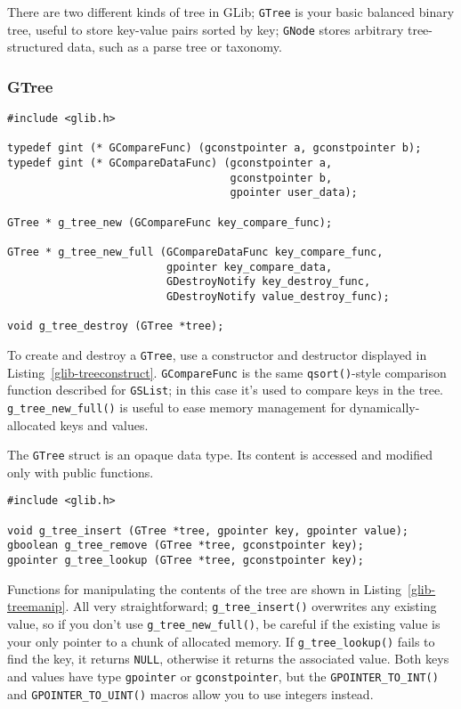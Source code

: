 There are two different kinds of tree in GLib; \lstinline{GTree} is your basic balanced binary tree, useful to store key-value pairs sorted by key; \lstinline{GNode} stores arbitrary tree-structured data, such as a parse tree or taxonomy.

\subsubsection{GTree}

\begin{lstlisting}[float, caption={Creating and destroying balanced binary trees}, label=glib-treeconstruct]
#include <glib.h>

typedef gint (* GCompareFunc) (gconstpointer a, gconstpointer b);
typedef gint (* GCompareDataFunc) (gconstpointer a,
                                   gconstpointer b,
                                   gpointer user_data);

GTree * g_tree_new (GCompareFunc key_compare_func);

GTree * g_tree_new_full (GCompareDataFunc key_compare_func,
                         gpointer key_compare_data,
                         GDestroyNotify key_destroy_func,
                         GDestroyNotify value_destroy_func);

void g_tree_destroy (GTree *tree);
\end{lstlisting}

To create and destroy a \lstinline{GTree}, use a constructor and destructor displayed in Listing~\ref{glib-treeconstruct}. \lstinline{GCompareFunc} is the same \lstinline{qsort()}-style comparison function described for \lstinline{GSList}; in this case it's used to compare keys in the tree. \lstinline{g_tree_new_full()} is useful to ease memory management for dynamically-allocated keys and values.

The \lstinline{GTree} struct is an opaque data type. Its content is accessed and modified only with public functions.

\begin{lstlisting}[float, caption={Manipulating \lstinline{GTree} contents}, label=glib-treemanip]
#include <glib.h>

void g_tree_insert (GTree *tree, gpointer key, gpointer value);
gboolean g_tree_remove (GTree *tree, gconstpointer key);
gpointer g_tree_lookup (GTree *tree, gconstpointer key);
\end{lstlisting}

Functions for manipulating the contents of the tree are shown in Listing~\ref{glib-treemanip}. All very straightforward; \lstinline{g_tree_insert()} overwrites any existing value, so if you don't use \lstinline{g_tree_new_full()}, be careful if the existing value is your only pointer to a chunk of allocated memory. If \lstinline{g_tree_lookup()} fails to find the key, it returns \lstinline{NULL}, otherwise it returns the associated value. Both keys and values have type \lstinline{gpointer} or \lstinline{gconstpointer}, but the \lstinline{GPOINTER_TO_INT()} and \lstinline{GPOINTER_TO_UINT()} macros allow you to use integers instead.

